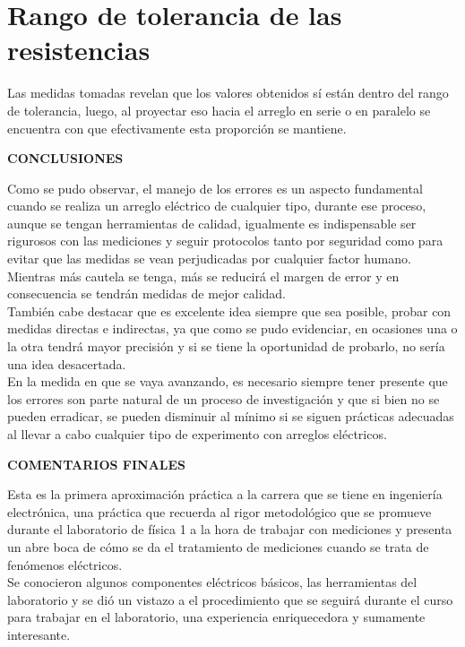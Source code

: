 \documentclass[12pt]{article}
\begin{document}
 	 \section*{Rango de tolerancia de las resistencias}
 	 
 	 \noindent Las medidas tomadas revelan que los valores obtenidos sí están dentro del rango de tolerancia, luego, al proyectar eso hacia el arreglo en serie o en paralelo se encuentra con que efectivamente esta proporción se mantiene.\\
 	 
 	 \newpage
 	 
 	 \begin{center}
 	 	\textbf{\large CONCLUSIONES}\\
 	 \end{center}
  
	  \noindent Como se pudo observar, el manejo de los errores es un aspecto fundamental cuando se realiza un arreglo eléctrico de cualquier tipo, durante ese proceso, aunque se tengan herramientas de calidad, igualmente es indispensable ser rigurosos con las mediciones y seguir protocolos tanto por seguridad como para evitar que las medidas se vean perjudicadas por cualquier factor humano. Mientras más cautela se tenga, más se reducirá el margen de error y en consecuencia se tendrán medidas de mejor calidad.\\
	  
	  \noindent También cabe destacar que es excelente idea siempre que sea posible, probar con medidas directas e indirectas, ya que como se pudo evidenciar, en ocasiones una o la otra tendrá mayor precisión y si se tiene la oportunidad de probarlo, no sería una idea desacertada.\\
	  
	  \noindent En la medida en que se vaya avanzando, es necesario siempre tener presente que los errores son parte natural de un proceso de investigación y que si bien no se pueden erradicar, se pueden disminuir al mínimo si se siguen prácticas adecuadas al llevar a cabo cualquier tipo de experimento con arreglos eléctricos.
	  
	  \newpage
	  
	  \begin{center}
	  	\textbf{\large COMENTARIOS FINALES}\\
	  \end{center}
  	  
  	  \noindent Esta es la primera aproximación práctica a la carrera que se tiene en ingeniería electrónica, una práctica que recuerda al rigor metodológico que se promueve durante el laboratorio de física 1 a la hora de trabajar con mediciones y presenta un abre boca de cómo se da el tratamiento de mediciones cuando se trata de fenómenos eléctricos.\\
  	  
  	  \noindent Se conocieron algunos componentes eléctricos básicos, las herramientas del laboratorio y se dió un vistazo a el procedimiento que se seguirá durante el curso para trabajar en el laboratorio, una experiencia enriquecedora y sumamente interesante.
  	  
\end{document}
